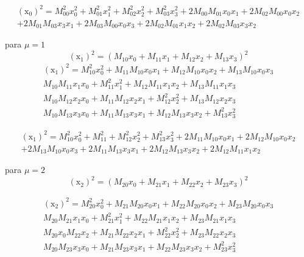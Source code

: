 \documentclass[10pt,a4paper]{article}
\begin{document}
\begin{enumerate}
	 \begin{equation}\nonumber
	 	\begin{split}
	 		(\text{\~{x}}_0)^2 =  M_{00}^2 x_0^2 +M_{01}^2 x_1^2+M_{02}^2x_2^2+M_{03}^2 x_3^2+ 2M_{00}M_{01} x_0x_1+2M_{02}M_{00} x_0 x_2\\+2M_{01}M_{03} x_3 x_1+2M_{03}M_{00} x_0 x_3+2M_{02}M_{01} x_1 x_2+2M_{02}M_{03} x_3 x_2
	 	\end{split}
	 \end{equation}
 
 	para $ \mu =1 $
 	$$ (\text{\~{x}}_1)^2 = (M_{10} x_0 + M_{11} x_1+M_{12} x_2+M_{13} x_3)^2 $$
 	\begin{equation}\nonumber
 		\begin{split}
 			(\text{\~{x}}_1)^2 = M_{10}^2 x_0^2 + M_{11}M_{10} x_0 x_1+M_{12} M_{10} x_0x_2+M_{13}M_{10} x_0 x_3\\
 			M_{10}M_{11} x_1 x_0 + M_{11}^2 x_1^2+M_{12}M_{11} x_1 x_2+M_{13}M_{11} x_1 x_3\\
 			M_{10}M_{12} x_2 x_0 + M_{11}M_{12} x_2 x_1+M_{12}^2 x_2^2+M_{13}M_{12} x_2 x_3\\
 			M_{10}M_{13} x_3x_0 + M_{11}M_{13} x_3 x_1+M_{12} M_{13} x_3x_2+M_{13}^2 x_3^2
 		\end{split}
 	\end{equation}
 
 	\begin{equation}\nonumber
 		\begin{split}
 			(\text{\~{x}}_1)^2 = M_{10}^2 x_0^2 + M_{11}^2+M_{12}^2 x_2^2+M_{13}^2 x_3^2+2M_{11}M_{10} x_0 x_1+2M_{12} M_{10} x_0x_2\\+2M_{13}M_{10} x_0 x_3+2M_{11}M_{13} x_3 x_1+2M_{12} M_{13} x_3x_2+2M_{12}M_{11} x_1 x_2
 		\end{split}
 	\end{equation}
	
	para $ \mu =2 $
	$$( \text{\~{x}}_2)^2 = (M_{20} x_0 + M_{21} x_1+M_{22} x_2+M_{23} x_3)^2 $$
	
	\begin{equation}\nonumber
		\begin{split}
			( \text{\~{x}}_2)^2 = M_{20}^2 x_0^2 + M_{21}M_{20} x_0 x_1+M_{22} M_{20} x_0x_2+M_{23} M_{20} x_0x_3\\
			M_{20}M_{21} x_1 x_0 + M_{21}^2 x_1^2+M_{22} M_{21} x_1x_2+M_{23}M_{21} x_1 x_3\\
			M_{20} x_0 M_{22} x_2+ M_{21} M_{22} x_2x_1+M_{22}^2 x_2^2+M_{23} M_{22} x_2x_3\\
			M_{20}M_{23} x_3 x_0 + M_{21} M_{23} x_3x_1+M_{22}M_{23} x_3 x_2+M_{23}^2 x_3^2	
		\end{split}
	\end{equation}


\end{enumerate}
\end{document}
